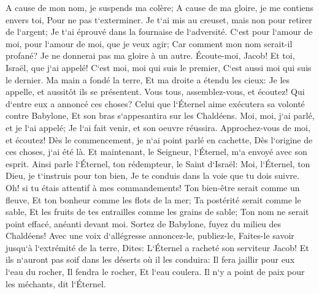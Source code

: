 \verse A cause de mon nom, je suspends ma colère; A cause de ma gloire, je me contiens envers toi, Pour ne pas t`exterminer. 
\verse Je t`ai mis au creuset, mais non pour retirer de l`argent; Je t`ai éprouvé dans la fournaise de l`adversité. 
\verse C`est pour l`amour de moi, pour l`amour de moi, que je veux agir; Car comment mon nom serait-il profané? Je ne donnerai pas ma gloire à un autre. 
\verse Écoute-moi, Jacob! Et toi, Israël, que j`ai appelé! C`est moi, moi qui suis le premier, C`est aussi moi qui suis le dernier. 
\verse Ma main a fondé la terre, Et ma droite a étendu les cieux: Je les appelle, et aussitôt ils se présentent. 
\verse Vous tous, assemblez-vous, et écoutez! Qui d`entre eux a annoncé ces choses? Celui que l`Éternel aime exécutera sa volonté contre Babylone, Et son bras s`appesantira sur les Chaldéens. 
\verse Moi, moi, j`ai parlé, et je l`ai appelé; Je l`ai fait venir, et son oeuvre réussira. 
\verse Approchez-vous de moi, et écoutez! Dès le commencement, je n`ai point parlé en cachette, Dès l`origine de ces choses, j`ai été là. Et maintenant, le Seigneur, l`Éternel, m`a envoyé avec son esprit. 
\verse Ainsi parle l`Éternel, ton rédempteur, le Saint d`Israël: Moi, l`Éternel, ton Dieu, je t`instruis pour ton bien, Je te conduis dans la voie que tu dois suivre. 
\verse Oh! si tu étais attentif à mes commandements! Ton bien-être serait comme un fleuve, Et ton bonheur comme les flots de la mer; 
\verse Ta postérité serait comme le sable, Et les fruits de tes entrailles comme les grains de sable; Ton nom ne serait point effacé, anéanti devant moi. 
\verse Sortez de Babylone, fuyez du milieu des Chaldéens! Avec une voix d`allégresse annoncez-le, publiez-le, Faites-le savoir jusqu`à l`extrémité de la terre, Dites: L`Éternel a racheté son serviteur Jacob! 
\verse Et ils n`auront pas soif dans les déserts où il les conduira: Il fera jaillir pour eux l`eau du rocher, Il fendra le rocher, Et l`eau coulera. 
\verse Il n`y a point de paix pour les méchants, dit l`Éternel. 

